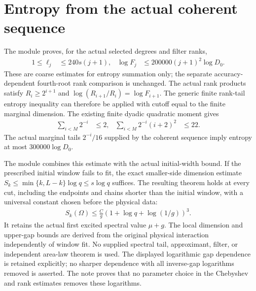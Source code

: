 \documentclass{article}
\begin{document}
\section{Entropy from the actual coherent sequence}

The module 
proves, for the actual selected degrees and filter ranks,
\begin{align*}
 1\le\ell_j&\le240s(j+1),&
 \log F_j&\le200000(j+1)^2\log D_0.
\end{align*}
These are coarse estimates for entropy summation only; the separate
accuracy-dependent fourth-root rank comparison is unchanged.
The actual rank products satisfy $R_i\ge2^{i+1}$ and
$\log(R_{i+1}/R_i)=\log F_{i+1}$. The generic finite rank-tail entropy
inequality can therefore be applied with cutoff equal to the finite
marginal dimension. The existing finite dyadic quadratic moment gives
\begin{align*}
 \sum_{i<M}2^{-i}&\le2,&
 \sum_{i<M}2^{-i}(i+2)^2&\le22.
\end{align*}
The actual marginal tails $2^{-i}/16$ supplied by the coherent sequence
imply entropy at most $300000\log D_0$.

The module  combines
this estimate with the actual initial-width bound. If the prescribed
initial window fails to fit, the exact smaller-side dimension estimate
$S_k\le\min\{k,L-k\}\log q\le s\log q$ suffices. The resulting theorem
holds at every cut, including the endpoints and chains shorter than the
initial window, with a universal constant chosen before the physical data:
\begin{align*}
 S_k(\Omega)\le\frac{C}{g}(1+\log q+\log(1/g))^3.
\end{align*}
It retains the actual first excited spectral value $\mu+g$. The local
dimension and upper-gap bounds are derived from the original physical
interaction independently of window fit. No supplied spectral tail,
approximant, filter, or independent area-law theorem is used. The displayed
logarithmic gap dependence is retained explicitly; no sharper dependence
with all inverse-gap logarithms removed is asserted.
The note 
proves that no parameter choice in the Chebyshev and rank estimates removes
these logarithms.
\end{document}
